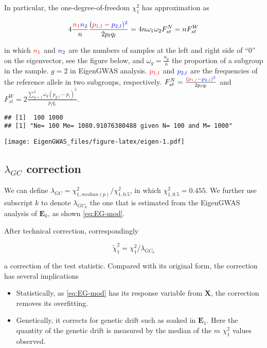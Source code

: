 \documentclass[]{book}
\begin{document}
In particular, the one-degree-of-freedom \(\chi^2_1\) has approximation
as

\begin{equation}
4\frac{\color{red}{n_1}\color{blue}{n_2}}{n}\frac{(\color{red}{p_{1,l}}-\color{blue}{p_{2,l}})^2}{2p_lq_l}=4n\omega_1 \omega_2 F_{st}^N=nF_{st}^W \label{eq:EG-chi}
\end{equation}

in which \(\color{red}{n_1}\) and \(\color{blue}{n_2}\) are the numbers
of samples at the left and right side of ``0'' on the eigenvector, see
the figure below, and \(\omega_g=\frac{n_g}{n}\) the proportion of a
subgroup in the sample. \(g=2\) in EigenGWAS analysis.
\(\color{red}{p_{1,l}}\) and \(\color{blue}{p_{2,l}}\) are the
frequencies of the reference allele in two subgroups, respectively.
\(F_{st}^N=\frac{(\color{red}{p_{1,l}}-\color{blue}{p_{2,l}})^2}{2p_lq_l}\)
and \(F_{st}^W=2\frac{\sum_{g=1}^2\omega_g(p_{g,l}-p_l)^2}{p_lq_l}\).

\begin{verbatim}
## [1]  100 1000
## [1] "Ne= 100 Me= 1080.91076380488 given N= 100 and M= 1000"
\end{verbatim}

\texttt{[image: EigenGWAS\_files/figure-latex/eigen-1.pdf]}

\hypertarget{lambda_gc-correction}{%
\subsection{\texorpdfstring{\(\lambda_{GC}\)
correction}{\textbackslash{}lambda\_\{GC\} correction}}\label{lambda_gc-correction}}

We can define \(\lambda_{GC}=\chi^2_{1,median(p)}/\chi^2_{1,0.5}\), in
which \(\chi^2_{1,0.5}=0.455\). We further use subscript \(k\) to denote
\(\lambda_{GC_k}\) the one that is estimated from the EigenGWAS analysis
of \(\mathbf{E}_k\), as shown \eqref{eq:EG-mod}.

After technical correction, correspondingly

\begin{equation}
\tilde\chi^2_1=\chi^2_1/\lambda_{GC_k} \label{eq:EG-chi-adj}
\end{equation}

a correction of the test statistic. Compared with its original form, the
correction has several implications

\begin{itemize}
\item
  Statistically, as \eqref{eq:EG-mod} has its response variable from
  \(\mathbf{X}\), the correction removes its overfitting.
\item
  Genetically, it corrects for genetic drift such as soaked in
  \(\mathbf{E}_1\). Here the quantity of the genetic drift is measured
  by the median of the \(m\) \(\chi^2_1\) values observed.
\end{itemize}
\end{document}
